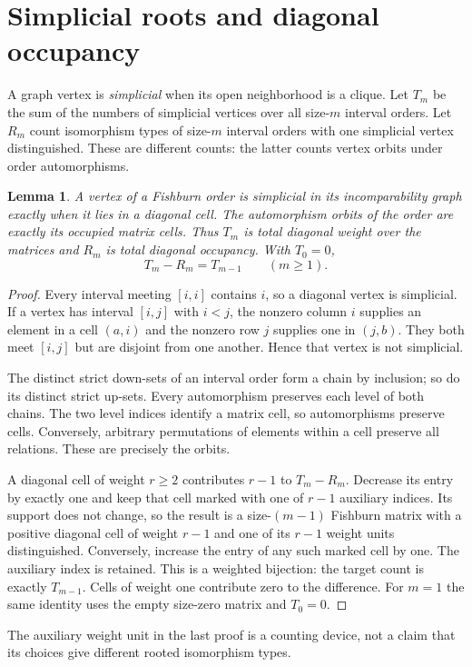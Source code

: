 \documentclass[11pt,letterpaper]{article}
\newtheorem{lemma}[theorem]{Lemma}
\theoremstyle{definition}\newtheorem{definition}[theorem]{Definition}
\theoremstyle{remark}\newtheorem{remark}[theorem]{Remark}
\begin{document}
\section{Simplicial roots and diagonal occupancy}\label{ivg:sec:diagonal}
A graph vertex is \emph{simplicial} when its open neighborhood is a clique. Let $T_m$ be the sum of the numbers of simplicial vertices over all size-$m$ interval orders. Let $R_m$ count isomorphism types of size-$m$ interval orders with one simplicial vertex distinguished. These are different counts: the latter counts vertex orbits under order automorphisms.

\begin{lemma}\label{ivg:lem:diagonal}
A vertex of a Fishburn order is simplicial in its incomparability graph exactly when it lies in a diagonal cell. The automorphism orbits of the order are exactly its occupied matrix cells. Thus $T_m$ is total diagonal weight over the matrices and $R_m$ is total diagonal occupancy. With $T_0=0$,
\begin{equation}\label{ivg:eq:exactdiagonal}
 T_m-R_m=T_{m-1}\qquad(m\ge1).
\end{equation}
\end{lemma}
\begin{proof}
Every interval meeting $[i,i]$ contains $i$, so a diagonal vertex is simplicial. If a vertex has interval $[i,j]$ with $i<j$, the nonzero column $i$ supplies an element in a cell $(a,i)$ and the nonzero row $j$ supplies one in $(j,b)$. They both meet $[i,j]$ but are disjoint from one another. Hence that vertex is not simplicial.

The distinct strict down-sets of an interval order form a chain by inclusion; so do its distinct strict up-sets. Every automorphism preserves each level of both chains. The two level indices identify a matrix cell, so automorphisms preserve cells. Conversely, arbitrary permutations of elements within a cell preserve all relations. These are precisely the orbits.

A diagonal cell of weight $r\ge2$ contributes $r-1$ to $T_m-R_m$. Decrease its entry by exactly one and keep that cell marked with one of $r-1$ auxiliary indices. Its support does not change, so the result is a size-$(m-1)$ Fishburn matrix with a positive diagonal cell of weight $r-1$ and one of its $r-1$ weight units distinguished. Conversely, increase the entry of any such marked cell by one. The auxiliary index is retained. This is a weighted bijection: the target count is exactly $T_{m-1}$. Cells of weight one contribute zero to the difference. For $m=1$ the same identity uses the empty size-zero matrix and $T_0=0$.
\end{proof}
The auxiliary weight unit in the last proof is a counting device, not a claim that its choices give different rooted isomorphism types.
\end{document}
